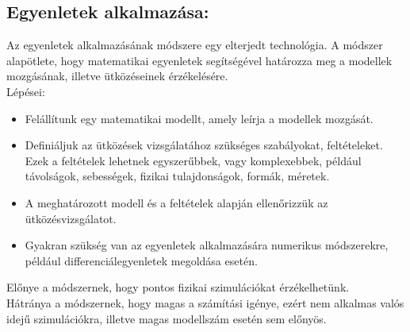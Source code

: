 \subsection{Egyenletek alkalmazása:}
Az egyenletek alkalmazásának módszere egy elterjedt technológia. A módszer alapötlete, hogy matematikai egyenletek segítségével határozza meg a modellek mozgásának, illetve ütközéseinek érzékelésére.
\\
Lépései:
\begin{itemize}
\item Felállítunk egy matematikai modellt, amely leírja a modellek mozgását.

\item Definiáljuk az ütközések vizsgálatához szükséges szabályokat, feltételeket. Ezek a feltételek lehetnek egyszerűbbek, vagy komplexebbek, például távolságok, sebességek, fizikai tulajdonságok, formák, méretek.

\item A meghatározott modell és a feltételek alapján ellenőrizzük az ütközésvizsgálatot.\

\item Gyakran szükség van az egyenletek alkalmazására numerikus módszerekre, például differenciálegyenletek megoldása esetén.
\end{itemize}
Előnye a módszernek, hogy pontos fizikai szimulációkat érzékelhetünk.\\
Hátránya a módszernek, hogy magas a számítási igénye, ezért nem alkalmas valós idejű szimulációkra, illetve magas modellszám esetén sem előnyös.